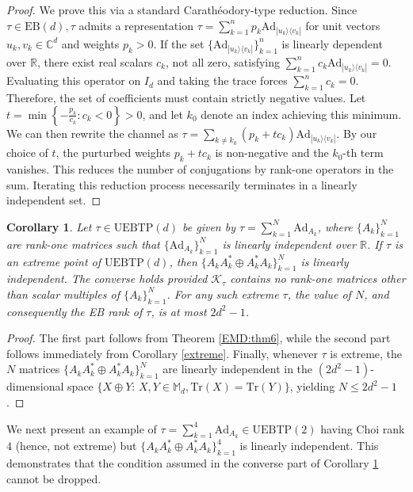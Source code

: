 \documentclass[11pt,reqno]{amsart}
\theoremstyle{definition}
\theoremstyle{plain}
\newtheorem{cor}[defn]{Corollary}
\theoremstyle{remark}
\newcommand{\la}{\langle}
\newcommand{\ra}{\rangle}
\numberwithin{equation}{section}%
\begin{document}
\begin{proof}
	We prove this via a standard Carath\'{e}odory-type reduction. Since $\tau \in \mathrm{EB}(d), \tau$ admits a representation $\tau = \sum_{k=1}^n p_k \text{Ad}_{|u_k\ra\la v_k|}$ for unit vectors $u_k, v_k \in \mathbb{C}^d$ and weights $p_k > 0$. If the set $\{\text{Ad}_{|u_k\ra\la v_k|}\}_{k=1}^n$ is linearly dependent over $\mathbb{R}$, there exist real scalars $c_k$, not all zero, satisfying $\sum_{k=1}^n c_k \text{Ad}_{|u_k\ra\la v_k|} = 0$. Evaluating this operator on $I_d$ and taking the trace forces $\sum_{k=1}^n c_k = 0$. Therefore, the set of coefficients must contain strictly negative values. Let $t = \min \left\{-\frac{p_k}{c_k} : c_k <0 \right\} > 0$, and let $k_0$ denote an index achieving this minimum. We can then rewrite the channel as $\tau = \sum_{k \neq k_0} (p_k + t c_k) \text{Ad}_{|u_k\ra\la v_k|}.$  By our choice of $t$, the purturbed weights $p_k + t c_k$ is non-negative and the $k_0$-th term vanishes. This reduces the number of conjugations by rank-one operators in the sum. Iterating this reduction process necessarily terminates in a linearly independent set.
\end{proof}


\begin{cor}\label{EMD:cor5}
	Let $\tau \in \mathrm{UEBTP}(d)$ be given by $\tau = \sum_{k=1}^N \text{Ad}_{A_k}$, where $\{A_k\}_{k=1}^N$ are rank-one matrices such that $\{\text{Ad}_{A_k}\}_{k=1}^N$ is linearly independent over $\mathbb{R}$. If $\tau$ is an extreme point of $\mathrm{UEBTP}(d)$, then $\{A_k A_k^* \oplus A_k^* A_k\}_{k=1}^N$ is linearly independent. The converse holds provided $\mathscr{K}_\tau$ contains no rank-one matrices other than scalar multiples of $\{A_k\}_{k=1}^N$. For any such extreme $\tau$, the value of $N$, and consequently the EB rank of $\tau$, is at most $2d^2-1$.
\end{cor}


\begin{proof}
The first part follows from Theorem \ref{EMD:thm6}, while the second part follows immediately from Corollary \ref{extreme}. Finally, whenever $\tau$ is extreme, the $N$ matrices $\{A_k A_k^* \oplus A_k^* A_k\}_{k=1}^N$ are linearly independent in the $(2d^2-1)$-dimensional space $\{X\oplus Y:\, X,Y\in\mathbb{M}_d,\text{Tr}(X)=\text{Tr}(Y)\}$, yielding $N\le 2d^2-1$.
\end{proof}


We next present an example of $\tau=\sum_{k=1}^4\text{Ad}_{A_k}\in\mathrm{UEBTP}(2)$ having Choi rank $4$ (hence, not extreme) but $\{A_kA_k^*\oplus A_k^*A_k\}_{k=1}^4$ is linearly independent. This demonstrates that the condition assumed in the converse part of Corollary \ref{EMD:cor5} cannot be dropped.
\end{document}

